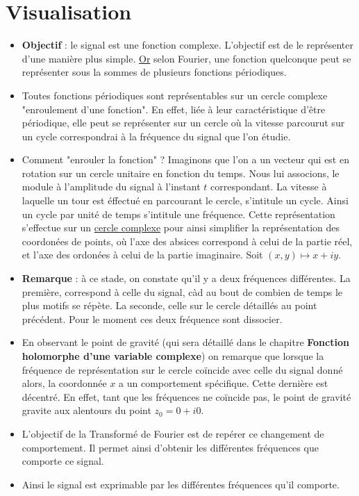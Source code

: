 \documentclass[a4paper]{book}
\begin{document}
\section{Visualisation}
\begin{itemize}
	\item \textbf{Objectif} : le signal est une fonction complexe.
		L'objectif est de le représenter d'une manière plus simple.
		\underline{Or} selon Fourier, une fonction quelconque peut se
		représenter sous la sommes de plusieurs fonctions périodiques.
	\item Toutes fonctions périodiques sont représentables sur un cercle
		complexe "enroulement d'une fonction". En effet, liée à leur
		caractéristique d'être périodique, elle peut se représenter sur
		un cercle où la vitesse parcourut sur un  cycle correspondrai à 
		la fréquence du signal que l'on étudie.
	\item Comment "enrouler la fonction" ? Imaginons que l'on a un vecteur
		qui est en rotation sur un cercle unitaire en fonction du temps.
		Nous lui associons, le module à l'amplitude du signal à
		l'instant $t$ correspondant. La vitesse à laquelle un tour est
		éffectué en parcourant le cercle, s'intitule un cycle. Ainsi un
		cycle par unité de temps s'intitule une fréquence. Cette
		représentation s'effectue sur un \underline{cercle complexe}
		pour ainsi simplifier la représentation des coordonées de
		points, où l'axe des absices correspond à celui de la partie
		réel, et l'axe des ordonées à celui de la partie imaginaire.
		Soit $(x,y) \mapsto x+iy$.
	\item \textbf{Remarque} : à ce stade, on constate qu'il y a deux
		fréquences différentes. La première, correspond à celle du
		signal, càd au bout de combien de temps le plus motifs se
		répète. La seconde, celle sur le cercle détaillés au point
		précédent. Pour le moment ces deux fréquence sont dissocier.
	\item En observant le point de gravité (qui sera détaillé dans le
		chapitre \textbf{Fonction holomorphe d'une variable complexe})
		on remarque que lorsque la fréquence
		de représentation sur le cercle coïncide avec celle du signal
		donné alors, la coordonnée $x$ a un comportement spécifique.
		Cette dernière est décentré. En effet, tant que les fréquences
		ne coïncide pas, le point de gravité gravite aux alentours du
		point $z_{0} = 0+i0$.
	\item L'objectif de la Transformé de Fourier est de repérer ce
		changement de comportement. Il permet ainsi d'obtenir les
		différentes fréquences que comporte ce signal.
	\item Ainsi le signal est exprimable par les différentes fréquences qu'il
		comporte.
\end{itemize}
\end{document}
